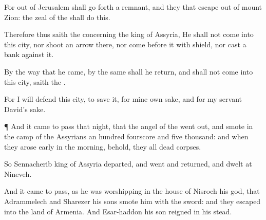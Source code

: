 {For out of
Jerusalem shall go
forth a
remnant, and they that
escape out of
mount
Zion: the
zeal of the
{}
{} shall
do this.

Therefore thus
saith the
{} concerning the
king of
Assyria, He shall not
come into this
city, nor
shoot an
arrow there, nor come
before it with
shield, nor
cast a
bank against it.

By the
way that he
came, by the same shall he
return, and shall not
come into this
city,
saith the
{}.

For I will
defend this
city, to
save it, for mine own sake, and for my
servant
David’s sake.


\par }{\PP {}¶ And it came to pass that
night, that the
angel of the
{} went
out, and
smote in the
camp of the
Assyrians an
hundred
fourscore and
five
thousand: and when they arose
early in the
morning, behold, they
{} all
dead
corpses.

So
Sennacherib
king of
Assyria
departed, and
went and
returned, and
dwelt at
Nineveh.

And it came to pass, as he was
worshipping in the
house of
Nisroch his
god, that
Adrammelech and
Sharezer his
sons
smote him with the
sword: and they
escaped into the
land of
Armenia. And
Esar-haddon his
son
reigned in his stead.




\par }
